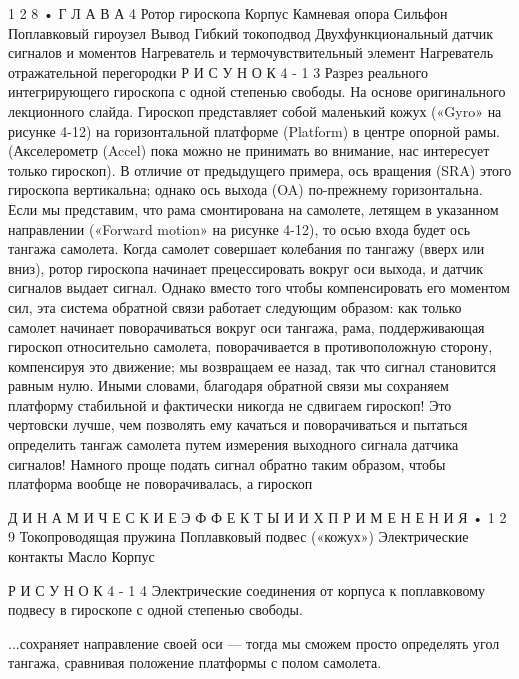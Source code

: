 \documentclass[10pt,oneside]{article}
\begin{document}
1 2 8 • Г Л А В А  4 Ротор гироскопа Корпус Камневая опора Сильфон Поплавковый гироузел Вывод Гибкий токоподвод Двухфункциональный датчик сигналов и моментов Нагреватель и термочувствительный элемент Нагреватель отражательной перегородки Р И С У Н О К  4 - 1 3 Разрез реального интегрирующего гироскопа с одной степенью свободы. На основе оригинального лекционного слайда. Гироскоп представляет собой маленький кожух («Gyro» на рисунке 4-12) на горизонтальной платформе (Platform) в центре опорной рамы. (Акселерометр (Accel) пока можно не принимать во внимание, нас интересует только гироскоп). В отличие от предыдущего примера, ось вращения (SRA) этого гироскопа вертикальна; однако ось выхода (OA) по-прежнему горизонтальна. Если мы представим, что рама смонтирована на самолете, летящем в указанном направлении («Forward motion» на рисунке 4-12), то осью входа будет ось тангажа самолета. Когда самолет совершает колебания по тангажу (вверх или вниз), ротор гироскопа начинает прецессировать вокруг оси выхода, и датчик сигналов выдает сигнал. Однако вместо того чтобы компенсировать его моментом сил, эта система обратной связи работает следующим образом: как только самолет начинает поворачиваться вокруг оси тангажа, рама, поддерживающая гироскоп относительно самолета, поворачивается в противоположную сторону, компенсируя это движение; мы возвращаем ее назад, так что сигнал становится равным нулю. Иными словами, благодаря обратной связи мы сохраняем платформу стабильной и фактически никогда не сдвигаем гироскоп! Это чертовски лучше, чем позволять ему качаться и поворачиваться и пытаться определить тангаж самолета путем измерения выходного сигнала датчика сигналов! Намного проще подать сигнал обратно таким образом, чтобы платформа вообще не поворачивалась, а гироскоп\par

Д И Н А М И Ч Е С К И Е  Э Ф Ф Е К Т Ы  И  И Х  П Р И М Е Н Е Н И Я • 1 2 9 Токопроводящая пружина Поплавковый подвес («кожух») Электрические контакты Масло Корпус\par

Р И С У Н О К  4 - 1 4 Электрические соединения от корпуса к поплавковому подвесу в гироскопе с одной степенью свободы.\par

...сохраняет направление своей оси --- тогда мы сможем просто определять угол тангажа, сравнивая положение платформы с полом самолета.\par
\end{document}
